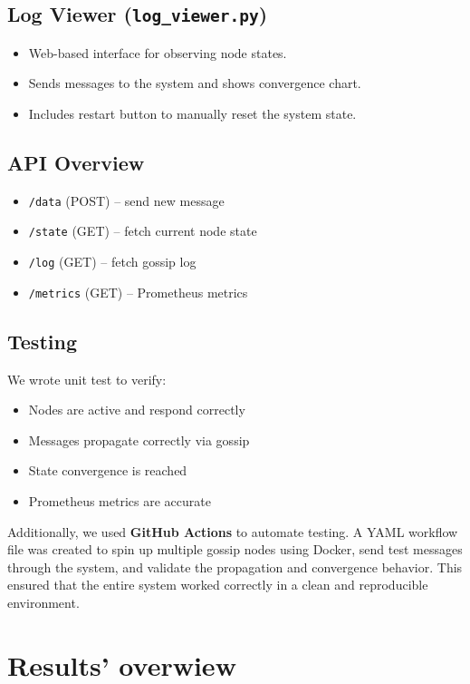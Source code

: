 \documentclass[a4paper,12pt]{article}
\begin{document}
\subsection*{Log Viewer (\texttt{log\_viewer.py})}
\begin{itemize}
    \item Web-based interface for observing node states.
    \item Sends messages to the system and shows convergence chart.
    \item Includes restart button to manually reset the system state.
\end{itemize}

\subsection*{API Overview}
\begin{itemize}
    \item \texttt{/data} (POST) – send new message
    \item \texttt{/state} (GET) – fetch current node state
    \item \texttt{/log} (GET) – fetch gossip log
    \item \texttt{/metrics} (GET) – Prometheus metrics
\end{itemize}

\subsection*{Testing}
We wrote unit test to verify:
\begin{itemize}
    \item Nodes are active and respond correctly
    \item Messages propagate correctly via gossip
    \item State convergence is reached
    \item Prometheus metrics are accurate
\end{itemize}
Additionally, we used \textbf{GitHub Actions} to automate testing. A YAML workflow file was created to spin up multiple gossip nodes using Docker, send test messages through the system, and validate the propagation and convergence behavior. This ensured that the entire system worked correctly in a clean and reproducible environment.

\section{Results' overwiew}
\end{document}
